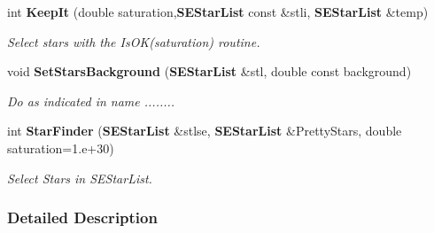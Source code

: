 \begin{CompactItemize}
\item 
{}
int {\bf Keep\-It} (double saturation,{\bf SEStar\-List} const \&stli, {\bf SEStar\-List} \&temp)\label{sestar_h_a15}

\begin{CompactList}\small\item\em Select stars with the Is\-OK(saturation) routine.\item\end{CompactList}\item 
{}
void {\bf Set\-Stars\-Background} ({\bf SEStar\-List} \&stl, double const background)\label{sestar_h_a16}

\begin{CompactList}\small\item\em Do as indicated in name ........\item\end{CompactList}\item 
{}
int {\bf Star\-Finder} ({\bf SEStar\-List} \&stlse, {\bf SEStar\-List} \&Pretty\-Stars, double saturation=1.e+30)\label{sestar_h_a17}

\begin{CompactList}\small\item\em Select Stars in SEStar\-List.\item\end{CompactList}\end{CompactItemize}


\subsubsection{Detailed Description}



